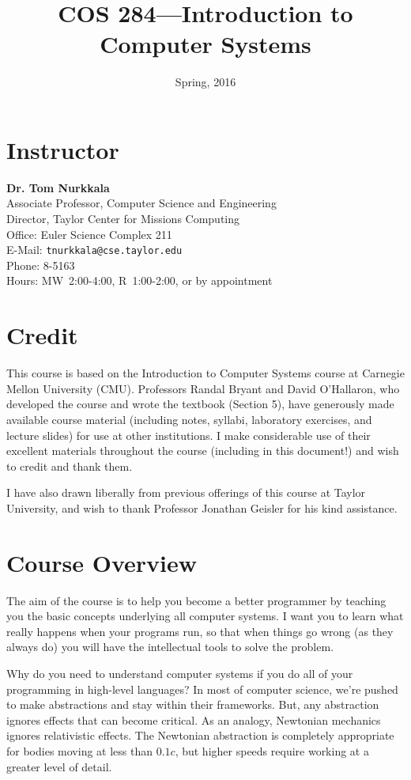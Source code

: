\documentclass{article}
\date{Spring, 2016}
\title{COS 284---Introduction to Computer Systems}
\renewcommand\maketitle\relax
\begin{document}
\maketitle
\section{Instructor}
\label{sec:orgheadline1}
\textbf{Dr. Tom Nurkkala}\\
Associate Professor, Computer Science and Engineering\\
Director, Taylor Center for Missions Computing\\
Office: Euler Science Complex 211\\
E-Mail: \texttt{tnurkkala@cse.taylor.edu}\\
Phone: 8-5163\\
Hours: MW~2:00-4:00, R~1:00-2:00, or by appointment\\

\section{Credit}
\label{sec:orgheadline2}
This course is based on the Introduction to Computer Systems course at Carnegie Mellon
University (CMU). Professors Randal Bryant and David O’Hallaron, who developed the course
and wrote the textbook (Section 5), have generously made available course material
(including notes, syllabi, laboratory exercises, and lecture slides) for use at other
institutions. I make considerable use of their excellent materials throughout the course
(including in this document!) and wish to credit and thank them.

I have also drawn liberally from previous offerings of this course at Taylor University,
and wish to thank Professor Jonathan Geisler for his kind assistance.

\section{Course Overview}
\label{sec:orgheadline3}
The aim of the course is to help you become a better programmer by teaching you the basic
concepts underlying all computer systems. I want you to learn what really happens when
your programs run, so that when things go wrong (as they always do) you will have the
intellectual tools to solve the problem.

Why do you need to understand computer systems if you do all of your programming in
high-level languages? In most of computer science, we're pushed to make abstractions and
stay within their frameworks. But, any abstraction ignores effects that can become
critical. As an analogy, Newtonian mechanics ignores relativistic effects. The Newtonian
abstraction is completely appropriate for bodies moving at less than \(0.1c\), but higher
speeds require working at a greater level of detail.
\end{document}
